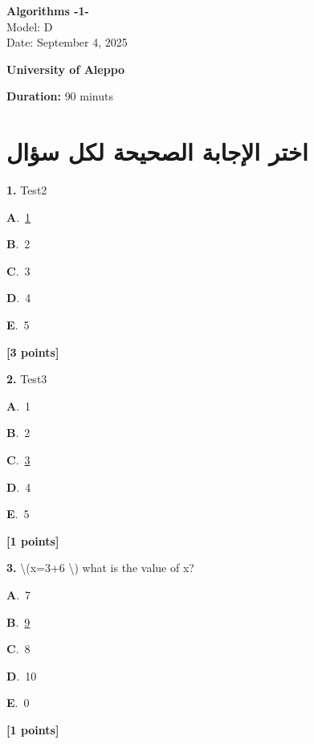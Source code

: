 \documentclass[12pt]{article}
\newcommand{\choice}[3]{%
  \noindent\textbf{#1}.~#2\hfill#3\par\vspace{0.25em}
}
\begin{document}
\begin{flushright}
{\Large \textbf{{\textenglish{Algorithms -1-}}}}\\[0.25em]
{\normalsize \textenglish{Model: }{\textenglish{D}}}\\[0.1em]
{\normalsize \textenglish{Date: }{\textenglish{September 4, 2025}}}
\end{flushright}

\vspace{0.6cm}

\noindent
\begin{minipage}[t]{0.65\textwidth}
  \raggedright
  \textbf{{\textenglish{University of Aleppo}}}\\[0.3em]
\end{minipage}\hfill
\begin{minipage}[t]{0.3\textwidth}
  \raggedleft
  \textenglish{\textbf{Duration: }}{\textenglish{90 minuts}}
\end{minipage}

\vspace{0.9cm}

\section*{اختر الإجابة الصحيحة لكل سؤال}

\noindent \textbf{\textenglish{1.}} {\textenglish{Test2}}

\noindent\choice{A}{\underline{{\textenglish{1}}}}{}
\noindent\choice{B}{{\textenglish{2}}}{}
\noindent\choice{C}{{\textenglish{3}}}{}
\noindent\choice{D}{{\textenglish{4}}}{}
\noindent\choice{E}{{\textenglish{5}}}{}
\hfill \textbf{[3 points]}\vspace{0.5em}

\noindent \textbf{\textenglish{2.}} {\textenglish{Test3}}

\noindent\choice{A}{{\textenglish{1}}}{}
\noindent\choice{B}{{\textenglish{2}}}{}
\noindent\choice{C}{\underline{{\textenglish{3}}}}{}
\noindent\choice{D}{{\textenglish{4}}}{}
\noindent\choice{E}{{\textenglish{5}}}{}
\hfill \textbf{[1 points]}\vspace{0.5em}

\noindent \textbf{\textenglish{3.}} {\textenglish{\textbackslash{}(x=3+6 \textbackslash{}) what is the value of x?}}

\noindent\choice{A}{{\textenglish{7}}}{}
\noindent\choice{B}{\underline{{\textenglish{9}}}}{}
\noindent\choice{C}{{\textenglish{8}}}{}
\noindent\choice{D}{{\textenglish{10}}}{}
\noindent\choice{E}{{\textenglish{0}}}{}
\hfill \textbf{[1 points]}\vspace{0.5em}
\end{document}

